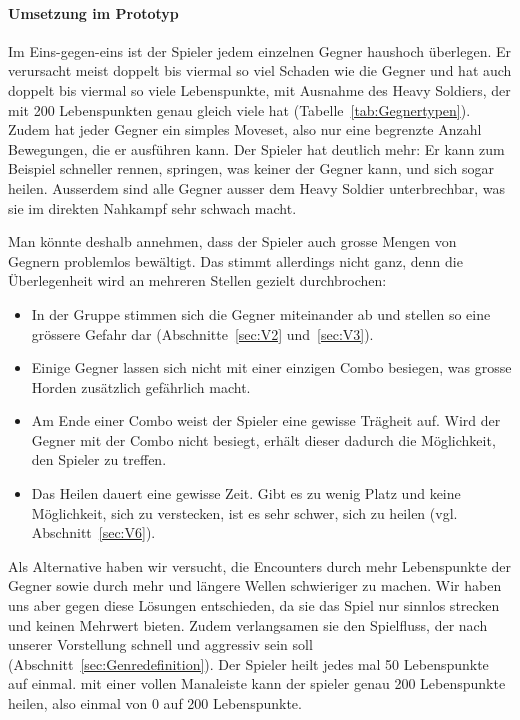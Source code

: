 \documentclass[../Main.tex]{subfiles}
\begin{document}
\paragraph{Umsetzung im Prototyp}
Im Eins-gegen-eins ist der Spieler jedem einzelnen Gegner haushoch überlegen. Er verursacht meist doppelt bis viermal so viel Schaden wie die Gegner und hat auch doppelt bis viermal so viele Lebenspunkte, mit Ausnahme des Heavy Soldiers, der mit 200 Lebenspunkten genau gleich viele hat (Tabelle~\ref{tab:Gegnertypen}). Zudem hat jeder Gegner ein simples Moveset, also nur eine begrenzte Anzahl Bewegungen, die er ausführen kann. Der Spieler hat deutlich mehr: Er kann zum Beispiel schneller rennen, springen, was keiner der Gegner kann, und sich sogar heilen. Ausserdem sind alle Gegner ausser dem Heavy Soldier unterbrechbar, was sie im direkten Nahkampf sehr schwach macht.

Man könnte deshalb annehmen, dass der Spieler auch grosse Mengen von Gegnern problemlos bewältigt. Das stimmt allerdings nicht ganz, denn die Überlegenheit wird an mehreren Stellen gezielt durchbrochen:

\begin{itemize}[leftmargin=1.5cm]
    \item In der Gruppe stimmen sich die Gegner miteinander ab und stellen so eine grössere Gefahr dar (Abschnitte~\ref{sec:V2} und~\ref{sec:V3}).
    \item Einige Gegner lassen sich nicht mit einer einzigen Combo besiegen, was grosse Horden zusätzlich gefährlich macht.
    \item Am Ende einer Combo weist der Spieler eine gewisse Trägheit auf. Wird der Gegner mit der Combo nicht besiegt, erhält dieser dadurch die Möglichkeit, den Spieler zu treffen.
    \item Das Heilen dauert eine gewisse Zeit. Gibt es zu wenig Platz und keine Möglichkeit, sich zu verstecken, ist es sehr schwer, sich zu heilen (vgl. Abschnitt~\ref{sec:V6}).
\end{itemize}

Als Alternative haben wir versucht, die Encounters durch mehr Lebenspunkte der Gegner sowie durch mehr und längere Wellen schwieriger zu machen. Wir haben uns aber gegen diese Lösungen entschieden, da sie das Spiel nur sinnlos strecken und keinen Mehrwert bieten. Zudem verlangsamen sie den Spielfluss, der nach unserer Vorstellung schnell und aggressiv sein soll (Abschnitt~\ref{sec:Genredefinition}). Der Spieler heilt jedes mal 50 Lebenspunkte auf einmal. mit einer vollen Manaleiste kann der spieler genau 200 Lebenspunkte heilen, also einmal von 0 auf 200 Lebenspunkte.
\end{document}
